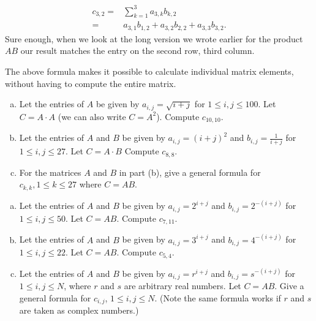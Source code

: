 \begin{align*}
{c}_{3,2} =& \sum_{k=1}^3 a_{3,k} b_{k,2} \\
=& a_{3,1} b_{1,2} + a_{3,2} b_{2,2} + a_{3,3} b_{3,2}.  
\end{align*}
Sure enough, when we look at the long version we wrote earlier for the product ${AB}$ our result matches the entry on the second row, third column.

The above formula makes it possible to calculate individual matrix elements, without having to compute the entire matrix.

\begin{exercise}{}
\begin{enumerate}[(a)]
\item
Let the entries of $A$ be given by $a_{i,j} = \sqrt{i+j}$ for $1 \le i,j \le 100$. Let $C = A\cdot A$ (we can also write $C=A^2$). Compute $c_{10,10}$.
\item
Let the entries of $A$ and $B$ be given by $a_{i,j} = (i+j)^2$ and $b_{i,j} = \frac{1}{i+j}$ for $1 \le i,j \le 27$. Let $C = A\cdot B$ Compute $c_{8,8}$.
\item
For the matrices $A$ and $B$ in part (b), give a general formula for $c_{k,k}, 1 \le k \le 27$ where $C=AB$.
\end{enumerate}
\end{exercise}

\begin{exercise}{}
\begin{enumerate}[(a)]
\item
Let the entries of $A$ and $B$ be given by $a_{i,j} =2^{i+j}$ and $b_{i,j} =2^{-(i+j)}$ for $1 \le i,j \le 50$. Let $C = AB$.  Compute $c_{7,11}$.
\item
Let the entries of $A$ and $B$ be given by $a_{i,j} =3^{i+j}$ and $b_{i,j} =4^{-(i+j)}$ for $1 \le i,j \le 22$. Let $C = AB$.  Compute $c_{5,4}$.
\item
Let the entries of $A$ and $B$ be given by $a_{i,j} =r^{i+j}$ and $b_{i,j} =s^{-(i+j)}$ for $1 \le i,j \le N$, where $r$ and $s$ are arbitrary real numbers. Let $C = AB$.  Give a general formula for $c_{i,j}$, $1\le i,j \le N$. (Note the same formula works if $r$ and $s$ are taken as complex numbers.) 
\end{enumerate}
\end{exercise}

